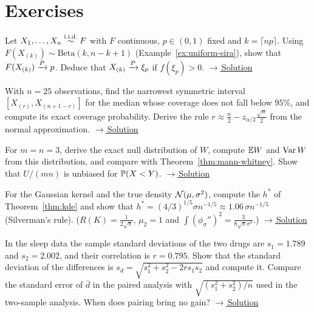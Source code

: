 \documentclass[main.tex]{subfiles}
\begin{document}
\section{Exercises}

\begin{exercise}\label{exr:21-1}
Let $X_1,\dots,X_n\iid F$ with $F$ continuous, $p\in(0,1)$ fixed and $k=\lceil np\rceil$. Using $F(X_{(k)})\sim\text{Beta}(k,n-k+1)$ (Example~\ref{ex:uniform-sira}), show that $F(X_{(k)})\pto p$. Deduce that $X_{(k)}\pto\xi_p$ if $f(\xi_p)>0$.
\hfill\hyperref[coz:21-1]{\footnotesize$\rightarrow$\,Solution}
\end{exercise}

\begin{exercise}\label{exr:21-2}
With $n=25$ observations, find the narrowest symmetric interval $[X_{(r)},X_{(n+1-r)}]$ for the median whose coverage does not fall below $95\%$, and compute its exact coverage probability. Derive the rule $r\approx\frac n2-z_{\alpha/2}\frac{\sqrt n}2$ from the normal approximation.
\hfill\hyperref[coz:21-2]{\footnotesize$\rightarrow$\,Solution}
\end{exercise}

\begin{exercise}\label{exr:21-3}
For $m=n=3$, derive the exact null distribution of $W$, compute $\E W$ and $\Var W$ from this distribution, and compare with Theorem~\ref{thm:mann-whitney}. Show that $U/(mn)$ is unbiased for $\P(X<Y)$.
\hfill\hyperref[coz:21-3]{\footnotesize$\rightarrow$\,Solution}
\end{exercise}

\begin{exercise}\label{exr:21-4}
For the Gaussian kernel and the true density $\Normal(\mu,\sigma^2)$, compute the $h^*$ of Theorem~\ref{thm:kde} and show that $h^*=(4/3)^{1/5}\sigma n^{-1/5}\approx1.06\,\sigma n^{-1/5}$ (Silverman's rule). ($R(K)=\frac1{2\sqrt\pi}$, $\mu_2=1$ and $\int(\phi_\sigma'')^2=\frac{3}{8\sqrt\pi\sigma^5}$.)
\hfill\hyperref[coz:21-4]{\footnotesize$\rightarrow$\,Solution}
\end{exercise}

\begin{exercise}\label{exr:21-5}
In the sleep data the sample standard deviations of the two drugs are $s_1=1.789$ and $s_2=2.002$, and their correlation is $r=0.795$. Show that the standard deviation of the differences is $s_d=\sqrt{s_1^2+s_2^2-2rs_1s_2}$ and compute it. Compare the standard error of $\bar d$ in the paired analysis with $\sqrt{(s_1^2+s_2^2)/n}$ used in the two-sample analysis. When does pairing bring no gain?
\hfill\hyperref[coz:21-5]{\footnotesize$\rightarrow$\,Solution}
\end{exercise}
\end{document}
